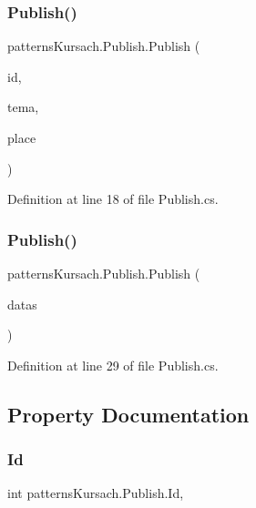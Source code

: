 \subsubsection{\texorpdfstring{Publish()}{Publish()}\hspace{0.1cm}{\footnotesize\ttfamily [1/2]}}
{\footnotesize\ttfamily patterns\+Kursach.\+Publish.\+Publish (\begin{DoxyParamCaption}\item[{int}]{id,  }\item[{string}]{tema,  }\item[{string}]{place }\end{DoxyParamCaption})}



Definition at line 18 of file Publish.\+cs.

\mbox{\label{classpatterns_kursach_1_1_publish_aa4276c74c450ea5d52ad3c5d993957e7}} 
\subsubsection{\texorpdfstring{Publish()}{Publish()}\hspace{0.1cm}{\footnotesize\ttfamily [2/2]}}
{\footnotesize\ttfamily patterns\+Kursach.\+Publish.\+Publish (\begin{DoxyParamCaption}\item[{Data\+Row}]{datas }\end{DoxyParamCaption})}



Definition at line 29 of file Publish.\+cs.



\subsection{Property Documentation}
\mbox{\label{classpatterns_kursach_1_1_publish_aea975a97fda5fe5ce6819b39f44dea76}} 
\subsubsection{\texorpdfstring{Id}{Id}}
{\footnotesize\ttfamily int patterns\+Kursach.\+Publish.\+Id\hspace{0.3cm}{\ttfamily [get]}, {\ttfamily [set]}}



